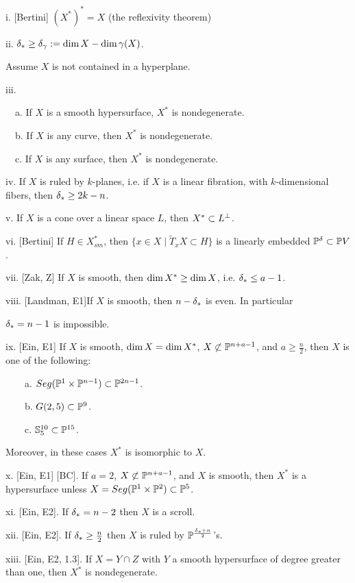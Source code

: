 i. [Bertini] $(X^*)^*=X$  ({\text the reflexivity theorem})

ii.  $\delta_{*}\geq 
\delta_{\gamma}:= \text{dim}\, X- \text{dim}\, \gamma (X)$.



Assume $X$ is not contained
in a hyperplane. 

iii.  

\ \ a. If $X$ is a smooth hypersurface, $X^*$ is nondegenerate.

\ \ b. If $X$ is any curve, then $X^*$ is nondegenerate.

\ \ c. If $X$ is any surface, then $X^*$ is nondegenerate.


iv. If $X$ is ruled by $k$-planes,
i.e. if 
$X$ is a linear  fibration, with
$k$-dimensional fibers, then $\delta_{*}\geq 2k-n$.


v. If $X$ is a cone over a linear space $L$, then $X^*\subset L{}^{\perp}$.
 
vi. [Bertini] If $H\in 
X^*_{sm}$, then $ 
\{ x\in X\mid \tilde T_xX\subset H\}$ is a linearly embedded
$\Bbb P^{\delta}\subset\Bbb P V$.

vii. [Zak, Z] If $X$ is smooth, then
 $\text{dim}\, X^*\geq \text{dim}\, X$, i.e. $\delta_{*}\leq
a-1$.

viii. [Landman, E1]If $X$ is smooth, then $n-\delta_{*}$ is even. In particular

$\delta_{*} = n-1$ is impossible.

ix. [Ein, E1] If $X$ is smooth, $\text{dim}\, X=\text{dim}\, X^*$,
$X\not\subset \Bbb P^{n+a -1}$,  and $a\geq\frac n2$, then
$X$ is one of the following:

 

\ \ \ \ a. $Seg(\Bbb P^{1}\times\Bbb P^{n-1})\subset\Bbb P^{2n-1}$.

\ \ \ \ b. $G(2,5)\subset\Bbb P^{9}$.

\ \ \ \ c. $\Bbb S^{10}_5\subset\Bbb P^{15}$.

Moreover, in these cases  $X^*$ is isomorphic to $X$.


x. [Ein, E1] [BC]. If $a=2$, $X\not\subset \Bbb P^{n+a -1}$, and $X$ is
smooth, then $X^*$ is a hypersurface 
unless $X=Seg(\Bbb P^{1}\times\Bbb P^{2})\subset\Bbb P^{5}$.

xi. [Ein, E2]. If $\delta_{*}= n-2$ then $X$ is a scroll.  

xii. [Ein, E2]. If $\delta_{*}\geq\frac n2$ then $X$ is ruled by
$\Bbb P^{\frac{\delta_{*}
+n}2}$'s.

xiii. [Ein, E2, 1.3]. 
If $X=Y\cap Z$ with $Y$ a smooth hypersurface of degree greater
than one, then $X^*$ is
nondegenerate. 

